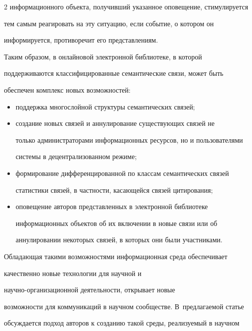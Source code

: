 \begin{multicols}{2}
информационного объекта, получивший указанное оповещение, стимулируется 


тем самым реагировать на эту ситуацию, если событие, о котором он 


информируется, противоречит его представлениям.


  


  Таким образом, в онлайновой электронной биб\-лио\-те\-ке, в которой 


поддерживаются классифицированные семантические связи, может быть 


обеспечен комплекс новых возможностей:


  \begin{itemize}


\item поддержка многослойной структуры семантических связей;


\item создание новых связей и аннулирование существующих связей не 


только администраторами информационных ресурсов, но и пользователями 


системы в децентрализованном режиме;


\item формирование дифференцированной по классам семантических связей 


статистики связей, в частности, касающейся связей цитирования;


\item оповещение авторов представленных в электронной библиотеке 


информационных объектов об их включении в новые связи или об 


аннулировании некоторых связей, в которых они были участниками. 


\end{itemize}





  Обладающая такими возможностями информационная среда обеспечивает 


качественно новые технологии для научной и 


  на\-уч\-но-ор\-га\-ни\-за\-ци\-он\-ной деятельности, открывает новые 


возможности для коммуникаций в научном сообществе. В~предлагаемой статье 


обсуждается подход авторов к созданию такой среды, реализуемый в научном 



\end{multicols}
